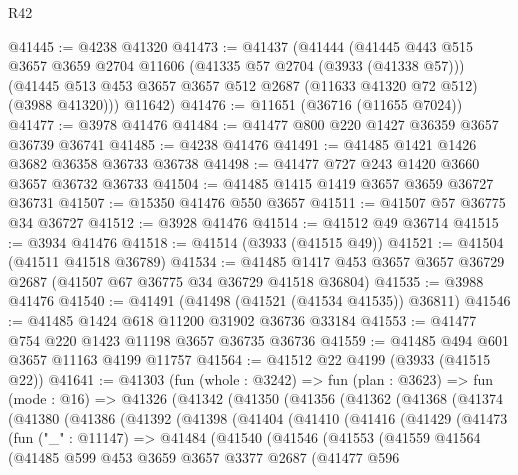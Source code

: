 \begin{lexlean}{R42}
\begin{coremodule}
@41445 := @4238 @41320
@41473 := @41437
    (@41444
      (@41445
        @443
        @515
        @3657
        @3659
        @2704
        @11606
        (@41335 @57 @2704 (@3933 (@41338 @57)))
        (@41445 @513 @453 @3657 @3657 @512 @2687 (@11633 @41320 @72 @512) (@3988 @41320)))
      @11642)
@41476 := @11651 (@36716 (@11655 @7024))
@41477 := @3978 @41476
@41484 := @41477 @800 @220 @1427 @36359 @3657 @36739 @36741
@41485 := @4238 @41476
@41491 := @41485 @1421 @1426 @3682 @36358 @36733 @36738
@41498 := @41477 @727 @243 @1420 @3660 @3657 @36732 @36733
@41504 := @41485 @1415 @1419 @3657 @3659 @36727 @36731
@41507 := @15350 @41476 @550 @3657
@41511 := @41507 @57 @36775 @34 @36727
@41512 := @3928 @41476
@41514 := @41512 @49 @36714
@41515 := @3934 @41476
@41518 := @41514 (@3933 (@41515 @49))
@41521 := @41504 (@41511 @41518 @36789)
@41534 := @41485 @1417 @453 @3657 @3657 @36729 @2687 (@41507 @67 @36775 @34 @36729 @41518 @36804)
@41535 := @3988 @41476
@41540 := @41491 (@41498 (@41521 (@41534 @41535)) @36811)
@41546 := @41485 @1424 @618 @11200 @31902 @36736 @33184
@41553 := @41477 @754 @220 @1423 @11198 @3657 @36735 @36736
@41559 := @41485 @494 @601 @3657 @11163 @4199 @11757
@41564 := @41512 @22 @4199 (@3933 (@41515 @22))
@41641 := @41303
    (fun (whole : @3242) =>
    fun (plan : @3623) =>
    fun (mode : @16) =>
    @41326
      (@41342
        (@41350
          (@41356
            (@41362
              (@41368
                (@41374
                  (@41380
                    (@41386
                      (@41392
                        (@41398
                          (@41404
                            (@41410
                              (@41416
                                (@41429
                                  (@41473
                                    (fun ("_" : @11147) =>
                                    @41484
                                      (@41540
                                        (@41546
                                          (@41553
                                            (@41559
                                              @41564
                                              (@41485
                                                @599
                                                @453
                                                @3659
                                                @3657
                                                @3377
                                                @2687
                                                (@41477
                                                  @596

\end{coremodule}
\end{lexlean}
